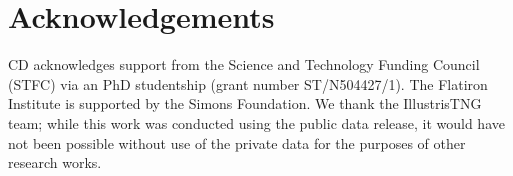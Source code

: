 \documentclass[fleqn,usenatbib]{mnras}
\begin{document}

\section*{Acknowledgements}
CD acknowledges support from the Science and Technology Funding Council (STFC) via an PhD studentship (grant number ST/N504427/1). The Flatiron Institute is supported by the Simons Foundation. We thank the IllustrisTNG team; while this work was conducted using the public data release, it would have not been possible without use of the private data for the purposes of other research works. 





 


\bsp	%
\label{lastpage}
\end{document}
